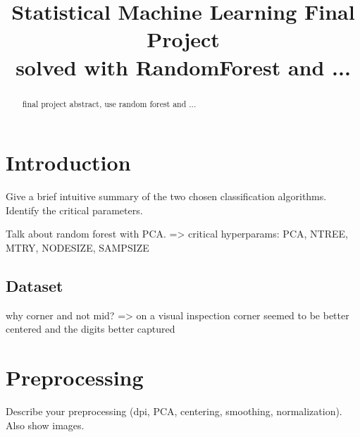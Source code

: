 \documentclass[conference]{IEEEtran}
\begin{document}
\title{Statistical Machine Learning Final Project\\
    {\large solved with RandomForest and ...}
}

\author{
\and
{}
\and
{}
}

\maketitle

\begin{abstract}
final project abstract, use random forest and ...
\end{abstract}

\section{Introduction}
Give a brief intuitive summary of the two chosen classification algorithms. Identify the critical parameters.

Talk about random forest with PCA. => critical hyperparams: PCA, NTREE, MTRY, NODESIZE, SAMPSIZE

\subsection{Dataset}
why corner and not mid? => on a visual inspection corner seemed to be better centered and the digits better captured

\section{Preprocessing}
Describe your preprocessing (dpi, PCA, centering, smoothing, normalization). Also show images.
\end{document}
